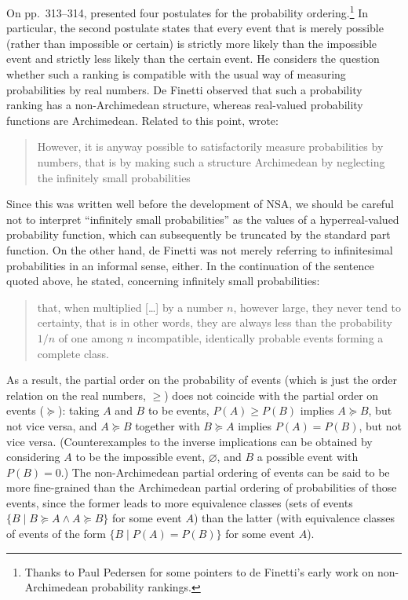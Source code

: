 On pp.~313--314, \citet[section~13]{deFinetti:1931} presented four postulates for the probability ordering.\footnote{Thanks to Paul Pedersen for some pointers to de Finetti's early work on non-Archimedean probability rankings.} In particular, the second postulate states that every event that is merely possible (rather than impossible or certain) is strictly more likely than the impossible event and strictly less likely than the certain event. He considers the question whether such a ranking is compatible with the usual way of measuring probabilities by real numbers. De Finetti observed that such a probability ranking has a non-Archimedean structure, whereas real-valued probability functions are Archimedean. Related to this point, \citet[p.~316]{deFinetti:1931} wrote:
\begin{quote}
However, it is anyway possible to satisfactorily measure probabilities by numbers, that is by making such a structure Archimedean by neglecting the infinitely small probabilities
\end{quote}
Since this was written well before the development of NSA, we should be careful not to interpret ``infinitely small probabilities'' as the values of a hyperreal-valued probability function, which can subsequently be truncated by the standard part function. On the other hand, de Finetti was not merely referring to infinitesimal probabilities in an informal sense, either. In the continuation of the sentence quoted above, he stated, concerning infinitely small probabilities:
\begin{quote}
that, when multiplied [\ldots] by a number $n$, however large, they never tend to certainty, that is in other words, they are always less than the probability $1/n$ of one among $n$ incompatible, identically probable events forming a complete class.
\end{quote}
As a result, the partial order on the probability of events (which is just the order relation on the real numbers, $\geq$) does not coincide with the partial order on events ($\succeq$): taking $A$ and $B$ to be events, $P(A) \geq P(B)$ implies $A \succeq B$, but not vice versa, and $A \succeq B$ together with $B \succeq A$ implies $P(A) = P(B)$, but not vice versa. (Counterexamples to the inverse implications can be obtained by considering $A$ to be the impossible event, $\varnothing$, and $B$ a possible event with $P(B)=0$.) The non-Archimedean partial ordering of events can be said to be more fine-grained than the Archimedean partial ordering of probabilities of those events, since the former leads to more equivalence classes (sets of events $\{B \mid B \succeq A \wedge A \succeq B \}$ for some event $A$) than the latter (with equivalence classes of events of the form $\{B \mid P(A) = P(B) \}$ for some event $A$).

